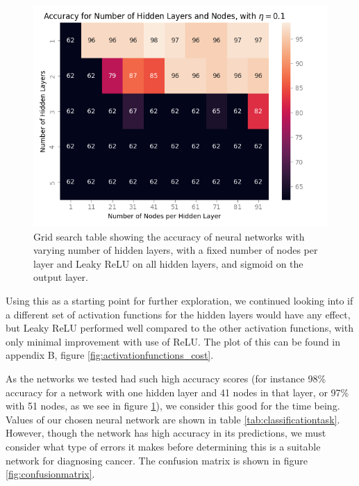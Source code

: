 
\begin{figure}
    \centering
    \includegraphics[width=\linewidth]{figures/all_plots/grid_search_layer_nodes.png}
    \caption{Grid search table showing the accuracy of neural networks with varying number of hidden layers, with a fixed number of nodes per layer and Leaky ReLU on all hidden layers, and sigmoid on the output layer.}
    \label{fig:gridsearch_layers_nodes}
\end{figure}

Using this as a starting point for further exploration, we continued looking into if a different set of activation functions for the hidden layers would have any effect, but Leaky ReLU performed well compared to the other activation functions, with only minimal improvement with use of ReLU. The plot of this can be found in appendix B, figure \ref{fig:activationfunctions_cost}. 

As the networks we tested had such high accuracy scores (for instance 98\% accuracy for a network with one hidden layer and 41 nodes in that layer, or 97\% with 51 nodes, as we see in figure \ref{fig:gridsearch_layers_nodes}), we consider this good for the time being. Values of our chosen neural network are shown in table \ref{tab:classificationtask}. However, though the network has high accuracy in its predictions, we must consider what type of errors it makes before determining this is a suitable network for diagnosing cancer. The confusion matrix is shown in figure \ref{fig:confusionmatrix}.

